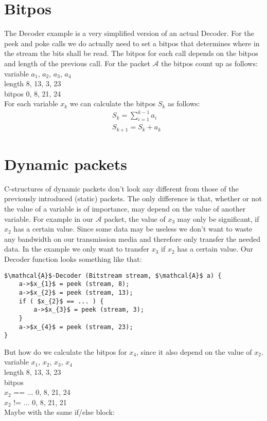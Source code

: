 \documentclass[paper=a4,DIV=12]{scrartcl}
\begin{document}
	\section{Bitpos}
		The Decoder example is a very simplified version of an actual Decoder. For the peek and poke calls we do actually need to set a bitpos
		that determines where in the stream the bits shall be read. The bitpos for each call depends on the bitpos and length of the previous call.
		For the packet $\mathcal{A}$ the bitpos count up as follows:\\
		variable   $a_{1}$, $a_{2}$, $a_{3}$, $a_{4}$\\
		length      8, 13,  3, 23\\
		bitpos      0,  8, 21, 24\\
		For each variable $x_{k}$ we can calculate the bitpos $S_{k}$ as follows:
		\begin{align*}
			&S_{k} = \sum_{i=1}^{k-1} a_{i}\\
			&S_{k+1} = S_{k} + a_{k}
		\end{align*}
	\section{Dynamic packets}
		C-structures of dynamic packets don't look any different from those of the previously introduced (static) packets.
		The only difference is that, whether or not the value of a variable is of importance, may depend on the value of another variable.	
		For example in our $\mathcal{A}$ packet, the value of $x_{3}$ may only be significant, if $x_{2}$ has a certain value.
		Since some data may be useless we don't want to waste any bandwidth on our transmission media and therefore only transfer the needed data.
		In the example we only want to transfer $x_{3}$ if $x_{2}$ has a certain value.
		Our Decoder function looks something like that:

		\begin{lstlisting}[mathescape]
$\mathcal{A}$-Decoder (Bitstream stream, $\mathcal{A}$ a) {
	a->$x_{1}$ = peek (stream, 8);
	a->$x_{2}$ = peek (stream, 13);
	if ( $x_{2}$ == ... ) {
		a->$x_{3}$ = peek (stream, 3);
	}
	a->$x_{4}$ = peek (stream, 23);
}
		\end{lstlisting}

		But how do we calculate the bitpos for $x_{4}$, since it also depend on the value of $x_{2}$.\\
		variable   $x_{1}$, $x_{2}$, $x_{3}$, $x_{4}$\\
		length        8, 13, 3, 23\\
		bitpos\\
		$x_{2}$ == ...  0, 8, 21, 24\\
		$x_{2}$ != ...  0, 8, 21, 21\\
		Maybe with the same if/else block:
\end{document}
